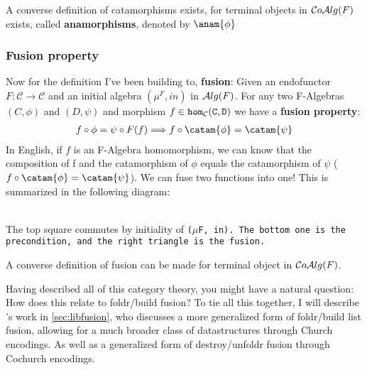 A converse definition of catamorphisms exists, for terminal objects in $\mathcal{C}o\mathcal{A}lg(F)$ exists, called \textbf{anamorphisms}, denoted by $\anam{\phi}$

\subsubsection{Fusion property}\label{sec:fusion_prop}
Now for the definition I've been building to, \textbf{fusion}:
Given an endofunctor $F:\mathcal{C}\to\mathcal{C}$ and an initial algebra $(\mu^F,in)$ in $\mathcal{A}lg(F)$. For any two F-Algebras $(C,\phi)$ and $(D,\psi)$ and morphism $f\in\tt{hom}_\mathcal{C}(C,D)$ we have a \textbf{fusion property}: \begin{align*} f\circ\phi=\psi\circ F(f) \Longrightarrow f\circ\catam{\phi}=\catam{\psi} \end{align*}
In English, if $f$ is an F-Algebra homomorphism, we can know that the composition of f and the catamorphism of $\phi$ equals the catamorphism of $\psi$ ($f\circ\catam{\phi}=\catam{\psi}$). We can fuse two functions into one! This is summarized in the following diagram:
\begin{figure}[H]\vspace{-1em}\hfill
{}\hfill\null
\end{figure}\vspace{-2em}~\\
The top square commutes by initiality of \tt{($\mu$F, in)}. The bottom one is the precondition, and the right triangle is the fusion.

A converse definition of fusion can be made for terminal object in $\mathcal{C}o\mathcal{A}lg(F)$.

Having described all of this category theory, you might have a natural question: How does this relate to foldr/build fusion?
To tie all this together, I will describe \cite{Harper2011}'s work in \autoref{sec:libfusion}, who discusses a more generalized form of foldr/build list fusion, allowing for a much broader class of datastructures through Church encodings. As well as a generalized form of destroy/unfoldr fusion through Cochurch encodings.

